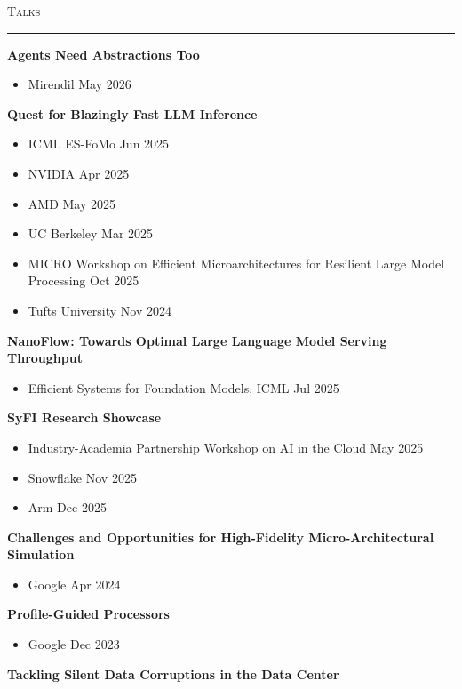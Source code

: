 \documentclass[10pt]{article}
\newcommand{\mysec}[1]{%
  \par\addvspace{2em}%
  \Needspace{8\baselineskip}%
  \noindent\textsc{\large #1}\par\vspace{1mm}\hrule\vspace{2mm}%
}
\newcommand{\mysub}[3]{\textbf{#1} {#2} \hfill {\em #3}}
\begin{document}
\mysec{Talks}
\mysub{Agents Need Abstractions Too}{}{}
\vspace{-2mm}
\begin{itemize}
  \setlength\itemsep{0em}
\item{Mirendil} \hfill May 2026
\end{itemize}
\mysub{Quest for Blazingly Fast LLM Inference}{}{}
\vspace{-2mm}
\begin{itemize}
  \setlength\itemsep{0em}
\item{ICML ES-FoMo} \hfill Jun 2025
\item{NVIDIA} \hfill Apr 2025
\item{AMD} \hfill May 2025
\item{UC Berkeley} \hfill Mar 2025
\item{MICRO Workshop on Efficient Microarchitectures for Resilient Large Model Processing} \hfill Oct 2025
\item{Tufts University} \hfill Nov 2024
\end{itemize}
\mysub{NanoFlow: Towards Optimal Large Language Model Serving Throughput}{}{}
\vspace{-2mm}
\begin{itemize}
  \setlength\itemsep{0em}
\item{Efficient Systems for Foundation Models, ICML} \hfill Jul 2025
\end{itemize}
\mysub{SyFI Research Showcase}{}{}
\vspace{-2mm}
\begin{itemize}
  \setlength\itemsep{0em}
\item{Industry-Academia Partnership Workshop on AI in the Cloud} \hfill May 2025
\item{Snowflake} \hfill Nov 2025
\item{Arm} \hfill Dec 2025
\end{itemize}
\mysub{Challenges and Opportunities for High-Fidelity Micro-Architectural Simulation}{}{}
\vspace{-2mm}
\begin{itemize}
  \setlength\itemsep{0em}
\item{Google} \hfill Apr 2024
\end{itemize}
\mysub{Profile-Guided Processors}{}{}
\vspace{-2mm}
\begin{itemize}
  \setlength\itemsep{0em}
\item{Google} \hfill Dec 2023
\end{itemize}
\mysub{Tackling Silent Data Corruptions in the Data Center}{}{}
\end{document}
